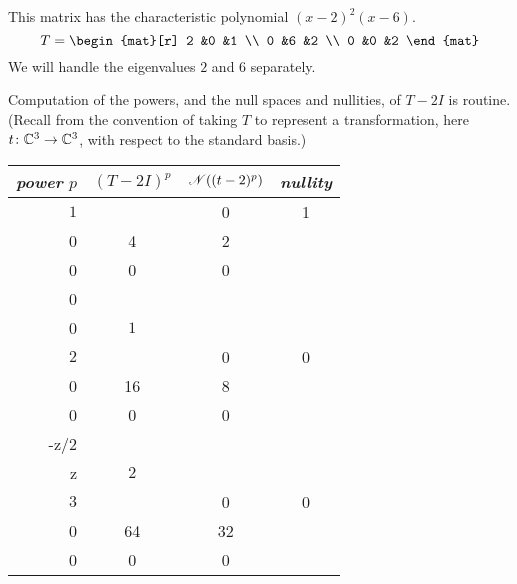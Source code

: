 \begin{example} \label{ex:FirstJordForm}
This matrix 
has the characteristic polynomial \( (x-2)^2(x-6) \).
\begin{equation*}
   T=
   \begin{mat}[r]
     2  &0  &1  \\
     0  &6  &2  \\
     0  &0  &2
   \end{mat}
\end{equation*}
We will handle the eigenvalues $2$ and $6$ separately.

Computation of the powers, and the null spaces and nullities, 
of $T-2I$ is routine.
(Recall from  the convention
of taking $T$ to represent a transformation, here $\mbox{$t\colon \mathbb{C}^3\to \mathbb{C}^3$}$,
with respect to the standard basis.)
\begin{center}
  \renewcommand{\arraystretch}{1.25}
  \begin{tabular}{r|ccc}
    \multicolumn{1}{c}{\textit{power} \( p \)}  
         &\( (T-2I)^p \) &\( \mathscr{N}((t-2)^p)  \) 
         &\textit{nullity}                                            \\  
    \hline
    \( 1 \)
    &\matrixvenlarge{\begin{mat}[r]
          0  &0  &1  \\
          0  &4  &2  \\
          0  &0  &0
        \end{mat}}
    &\( \set{\matrixvenlarge{\colvec{x \\ 0 \\ 0}}
         \suchthat x\in\C}  \)  
    &$1$                                                   \\
    \( 2 \)
    &\matrixvenlarge{\begin{mat}[r]
          0  &0  &0  \\
          0  &16 &8  \\
          0  &0  &0
        \end{mat}}
    &\( \set{\matrixvenlarge{\colvec{x \\ -z/2 \\  z}}
               \suchthat x,z\in\C}  \) 
    &$2$                                                   \\
    \( 3 \)
    &\matrixvenlarge{\begin{mat}[r]
          0  &0  &0  \\
          0  &64 &32 \\
          0  &0  &0

\end{mat}}
\end{tabular}
\end{center}
\end{example}
